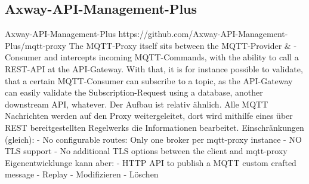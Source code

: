     \subsection{Axway-API-Management-Plus}
    Axway-API-Management-Plus
    https://github.com/Axway-API-Management-Plus/mqtt-proxy
    The MQTT-Proxy itself sits between the MQTT-Provider \& -Consumer and intercepts incoming MQTT-Commands, with the ability to call a REST-API at the API-Gateway. With that, it is for instance possible to validate, that a certain MQTT-Consumer can subscribe to a topic, as the API-Gateway can easily validate the Subscription-Request using a database, another downstream API, whatever.
    Der Aufbau ist relativ ähnlich.
    Alle MQTT Nachrichten werden auf den Proxy weitergeleitet, dort wird mithilfe eines über REST bereitgestellten Regelwerks die Informationen bearbeitet.
    Einschränkungen (gleich):
    - No configurable routes: Only one broker per mqtt-proxy instance
    - NO TLS support
    - No additional TLS options between the client and mqtt-proxy
    Eigenentwicklunge kann aber:
    - HTTP API to publish a MQTT custom crafted message
    - Replay
    - Modifizieren
    - Löschen